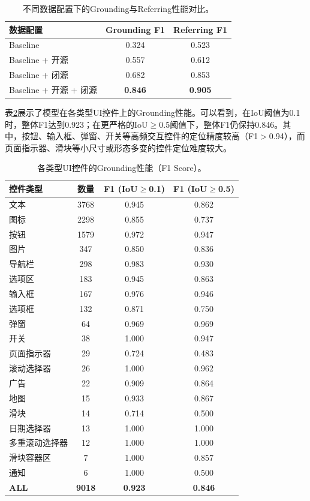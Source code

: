 \begin{table}[htbp]
\centering
\small
\renewcommand{\arraystretch}{1.3}
\begin{tabular}{lcc}
\toprule
\textbf{数据配置} & \textbf{Grounding F1} & \textbf{Referring F1} \\
\midrule
Baseline & 0.324 & 0.523 \\
Baseline + 开源 & 0.557 & 0.612 \\
Baseline + 闭源 & 0.682 & 0.853 \\
Baseline + 开源 + 闭源 & \textbf{0.846} & \textbf{0.905} \\
\bottomrule
\end{tabular}
\caption{不同数据配置下的Grounding与Referring性能对比。}
\label{tab:gui_data_ablation}
\end{table}

表\ref{tab:gui_grounding}展示了模型在各类型UI控件上的Grounding性能。可以看到，在IoU阈值为0.1时，整体F1达到0.923；在更严格的IoU$\ge$0.5阈值下，整体F1仍保持0.846。其中，按钮、输入框、弹窗、开关等高频交互控件的定位精度较高（F1$>$0.94），而页面指示器、滑块等小尺寸或形态多变的控件定位难度较大。

\begin{table}[htbp]
\centering
\small
\renewcommand{\arraystretch}{1.2}
\begin{tabular}{lccc}
\toprule
\textbf{控件类型} & \textbf{数量} & \textbf{F1 (IoU$\ge$0.1)} & \textbf{F1 (IoU$\ge$0.5)} \\
\midrule
文本 & 3768 & 0.945 & 0.862 \\
图标 & 2298 & 0.855 & 0.737 \\
按钮 & 1579 & 0.972 & 0.947 \\
图片 & 347 & 0.850 & 0.836 \\
导航栏 & 298 & 0.983 & 0.930 \\
选项区 & 183 & 0.945 & 0.863 \\
输入框 & 167 & 0.976 & 0.946 \\
选项框 & 132 & 0.871 & 0.750 \\
弹窗 & 64 & 0.969 & 0.969 \\
开关 & 38 & 1.000 & 0.947 \\
页面指示器 & 29 & 0.724 & 0.483 \\
滚动选择器 & 26 & 1.000 & 0.962 \\
广告 & 22 & 0.909 & 0.864 \\
地图 & 15 & 0.933 & 0.867 \\
滑块 & 14 & 0.714 & 0.500 \\
日期选择器 & 13 & 1.000 & 1.000 \\
多重滚动选择器 & 12 & 1.000 & 1.000 \\
滑块容器区 & 7 & 1.000 & 0.857 \\
通知 & 6 & 1.000 & 0.500 \\
\textbf{ALL} & \textbf{9018} & \textbf{0.923} & \textbf{0.846} \\
\bottomrule
\end{tabular}
\caption{各类型UI控件的Grounding性能（F1 Score）。}
\label{tab:gui_grounding}
\end{table}

